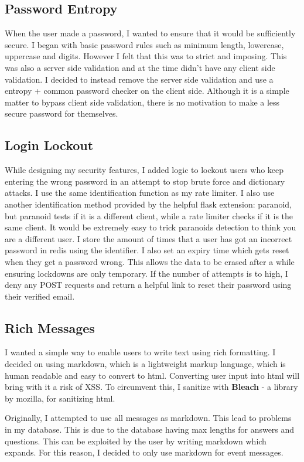 \documentclass[a4paper,oneside,12pt]{report}
\begin{document}
	\subsection{Password Entropy}
	When the user made a password, I wanted to ensure that it would be sufficiently secure. I began with basic password rules such as minimum length, lowercase, uppercase and digits. However I felt that this was to strict and imposing. This was also a server side validation and at the time didn’t have any client side validation. I decided to instead remove the server side validation and use a entropy + common password checker on the client side. Although it is a simple matter to bypass client side validation, there is no motivation to make a less secure password for themselves.

	\subsection{Login Lockout}
	While designing my security features, I added logic to lockout users who keep entering the wrong password in an attempt to stop brute force and dictionary attacks. I use the same identification function as my rate limiter. I also use another identification method provided by the helpful flask extension: paranoid, but paranoid tests if it is a different client, while a rate limiter checks if it is the same client. It would be extremely easy to trick paranoids detection to think you are a different user. I store the amount of times that a user has got an incorrect password in redis using the identifier. I also set an expiry time which gets reset when they get a password wrong. This allows the data to be erased after a while ensuring lockdowns are only temporary. If the number of attempts is to high, I deny any POST requests and return a helpful link to reset their password using their verified email.

	\subsection{Rich Messages}
	I wanted a simple way to enable users to write text using rich formatting. I decided on using markdown, which is a lightweight markup language, which is human readable and easy to convert to html. Converting user input into html will bring with it a risk of XSS. To circumvent this, I sanitize with \textbf{Bleach} - a library by mozilla, for sanitizing html.


	Originally, I attempted to use all messages as markdown. This lead to problems in my database. This is due to the database having max lengths for answers and questions. This can be exploited by the user by writing markdown which expands. For this reason, I decided to only use markdown for event messages.
\end{document}
